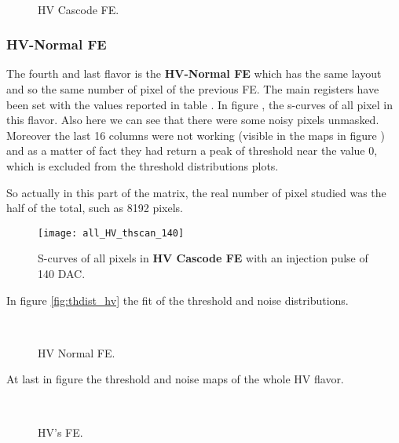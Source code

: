 \begin{figure}[h!]
\centering
{}\quad
{}\\
\caption{HV Cascode FE.}
\label{fig:thdist_hvc}
\end{figure}


\subsubsection{HV-Normal FE}\label{first_xtalk}

The fourth and last flavor is the \textbf{HV-Normal FE} which has the same layout and so the same number of pixel of the previous FE. The main registers have been set with the values reported in table .
In figure , the s-curves of all pixel in this flavor. Also here we can see that there were some noisy pixels unmasked.
Moreover the last 16 columns were not working (visible in the maps in figure ) and as a matter of fact they had return a peak of threshold near the value 0, which is excluded from the threshold distributions plots.

So actually in this part of the matrix, the real number of pixel studied was the half of the total, such as 8192 pixels.


\begin{figure}[h!]
\centering
\texttt{[image: all\_HV\_thscan\_140]}
\caption{S-curves of all pixels in \textbf{HV Cascode FE} with an injection pulse of 140 DAC.}
\label{fig:hv_scurve_140}
\end{figure}

In figure \vref{fig:thdist_hv} the fit of the threshold and noise distributions.

\begin{figure}[h!]
\centering
{}\quad
{}\\
\caption{HV Normal FE.}
\label{fig:thdist_hv}
\end{figure}


At last in figure  the threshold and noise maps of the whole HV flavor.

\begin{figure}[h!]
\centering
{}\quad
{}\\
\caption{HV's FE.}
\label{fig:HVs_maps}
\end{figure}

